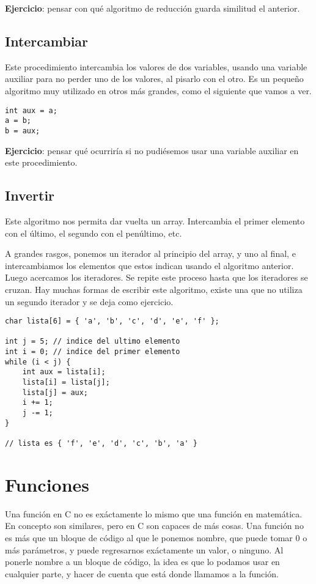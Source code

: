 \documentclass[10pt]{article}
\begin{document}
\textbf{Ejercicio}: pensar con qué algoritmo de reducción guarda similitud el anterior.

\subsection{Intercambiar}

Este procedimiento intercambia los valores de dos variables, usando una variable auxiliar para no perder uno de los valores, al pisarlo con el otro. Es un pequeño algoritmo muy utilizado en otros más grandes, como el siguiente que vamos a ver.

\begin{lstlisting}
int aux = a;
a = b;
b = aux;
\end{lstlisting}

\textbf{Ejercicio}: pensar qué ocurriría si no pudiésemos usar una variable auxiliar en este procedimiento.

\subsection{Invertir}

Este algoritmo nos permita dar vuelta un array. Intercambia el primer elemento con el último, el segundo con el penúltimo, etc.

\bigskip

A grandes rasgos, ponemos un iterador al principio del array, y uno al final, e intercambiamos los elementos que estos indican usando el algoritmo anterior. Luego acercamos los iteradores. Se repite este proceso hasta que los iteradores se cruzan. Hay muchas formas de escribir este algoritmo, existe una que no utiliza un segundo iterador y se deja como ejercicio.

\begin{lstlisting}
char lista[6] = { 'a', 'b', 'c', 'd', 'e', 'f' };

int j = 5; // indice del ultimo elemento
int i = 0; // indice del primer elemento
while (i < j) {
	int aux = lista[i];
	lista[i] = lista[j];
	lista[j] = aux;
	i += 1;
	j -= 1;
}

// lista es { 'f', 'e', 'd', 'c', 'b', 'a' }
\end{lstlisting}

\section{Funciones}

Una función en C no es exáctamente lo mismo que una función en matemática. En concepto son similares, pero en C son capaces de más cosas. Una función no es más que un bloque de código al que le ponemos nombre, que puede tomar 0 o más parámetros, y puede regresarnos exáctamente un valor, o ninguno. Al ponerle nombre a un bloque de código, la idea es que lo podamos usar en cualquier parte, y hacer de cuenta que está donde llamamos a la función.
\end{document}
